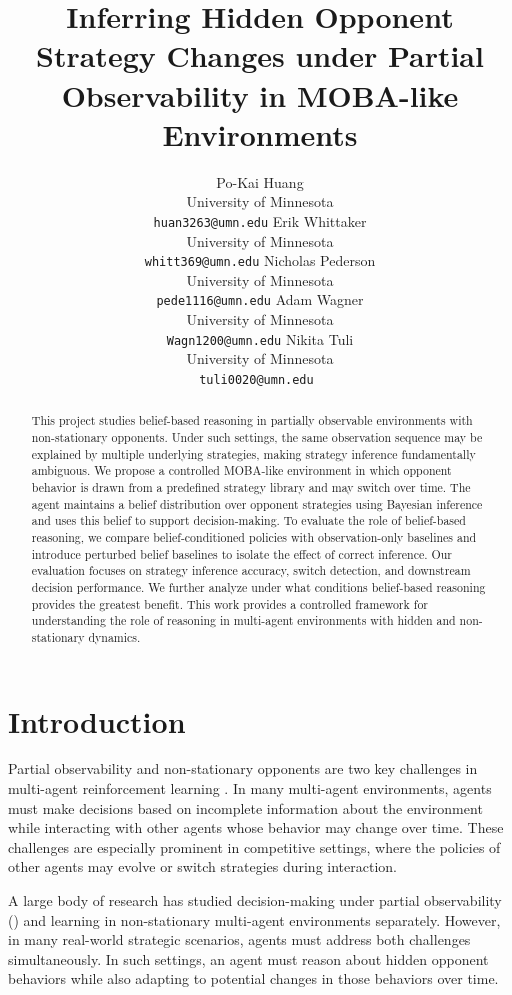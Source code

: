 \documentclass{article}
\title{Inferring Hidden Opponent Strategy Changes under Partial Observability in MOBA-like Environments}
\author{
Po-Kai Huang \\
University of Minnesota \\
\texttt{huan3263@umn.edu}
\And
Erik Whittaker \\
University of Minnesota \\
\texttt{whitt369@umn.edu}
\And
Nicholas Pederson \\
University of Minnesota \\
\texttt{pede1116@umn.edu}
\AND
Adam Wagner \\
University of Minnesota \\
\texttt{Wagn1200@umn.edu}
\And
Nikita Tuli \\
University of Minnesota \\
\texttt{tuli0020@umn.edu }
}
\begin{document}
\maketitle


\begin{abstract}
  This project studies belief-based reasoning in partially observable environments with non-stationary opponents. Under such settings, the same observation sequence may be explained by multiple underlying strategies, making strategy inference fundamentally ambiguous. We propose a controlled MOBA-like environment in which opponent behavior is drawn from a predefined strategy library and may switch over time. The agent maintains a belief distribution over opponent strategies using Bayesian inference and uses this belief to support decision-making. To evaluate the role of belief-based reasoning, we compare belief-conditioned policies with observation-only baselines and introduce perturbed belief baselines to isolate the effect of correct inference. Our evaluation focuses on strategy inference accuracy, switch detection, and downstream decision performance. We further analyze under what conditions belief-based reasoning provides the greatest benefit. This work provides a controlled framework for understanding the role of reasoning in multi-agent environments with hidden and non-stationary dynamics.
\end{abstract}


\section{Introduction}

Partial observability and non-stationary opponents are two key challenges in multi-agent reinforcement learning \cite{hernandez2017survey, hernandez2019critique, papoudakis2019dealing}. In many multi-agent environments, agents must make decisions based on incomplete information about the environment while interacting with other agents whose behavior may change over time. These challenges are especially prominent in competitive settings, where the policies of other agents may evolve or switch strategies during interaction.

A large body of research has studied decision-making under partial observability (\cite{srinivasan2018acpo}) and learning in non-stationary multi-agent environments separately. However, in many real-world strategic scenarios, agents must address both challenges simultaneously. In such settings, an agent must reason about hidden opponent behaviors while also adapting to potential changes in those behaviors over time.
\end{document}
